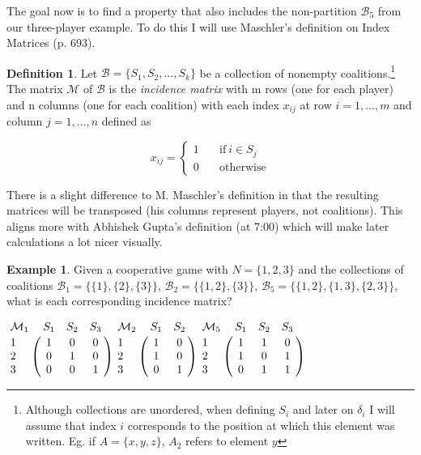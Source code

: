 \documentclass[10pt,a4paper,titlepage]{article}
\theoremstyle{plain}
\theoremstyle{definition}
\newtheorem{definition}[thm]{Definition} %
\newtheorem{example}[thm]{Example} %
\begin{document}
The goal now is to find a property that also includes the non-partition $\mathcal{B}_5$ from our three-player example. To do this I will use Maschler's\cite{maschler} definition on Index Matrices (p. 693).

\begin{definition}\label{def:incidencematrix}
    Let $\mathcal{B} = \{S_1, S_2, ..., S_k\}$ be a collection of nonempty coalitions.\footnote{Although collections are unordered, when defining $S_i$ and later on $\delta_i$ I will assume that index $i$ corresponds to the position at which this element was written. Eg. if $A = \{x, y, z\}$, $A_2$ refers to element $y$} The matrix $\mathcal{M}$ of $\mathcal{B}$ is the \textit{incidence matrix} with m rows (one for each player) and n columns (one for each coalition) with each index $x_{ij}$ at row $i = {1, ..., m}$ and column $j = {1, ..., n}$ defined as\vspace{-15pt}

    \begin{equation*}
        x_{ij} =
        \begin{cases}
            1 & \quad\text{if}\ i \in S_j\\
            0 & \quad\text{otherwise}
        \end{cases}
    \end{equation*}
\end{definition}

There is a slight difference to M. Maschler's\cite{maschler} definition in that the resulting matrices will be transposed (his columns represent players, not coalitions). This aligns more with Abhishek Gupta's\cite{youtube} definition (at 7:00) which will make later calculations a lot nicer visually.

\begin{example}\label{ex:indexmatrix}
    Given a cooperative game with $N = \{1, 2, 3\}$ and the collections of coalitions $\mathcal{B}_1 = \{\{1\}, \{2\}, \{3\}\}$, $\mathcal{B}_2 = \{\{1, 2\}, \{3\}\}$, $\mathcal{B}_5 = \{\{1, 2\}, \{1, 3\}, \{2, 3\}\}$, what is each corresponding incidence matrix?\vspace{8pt}

    $
    \bordermatrix{
    \mathcal{M}_1 & S_1 & S_2 & S_3 \cr
    1 & 1 & 0 & 0 \cr
    2 & 0 & 1 & 0 \cr
    3 & 0 & 0 & 1 \cr
    }
    $\hspace{35pt}$
    \bordermatrix{
    \mathcal{M}_2 & S_1 & S_2\cr
    1 & 1 & 0 \cr
    2 & 1 & 0 \cr
    3 & 0 & 1 \cr
    }
    $\hspace{35pt}$
    \bordermatrix{
    \mathcal{M}_5 & S_1 & S_2 & S_3 \cr
    1 & 1 & 1 & 0 \cr
    2 & 1 & 0 & 1 \cr
    3 & 0 & 1 & 1 \cr
    }
    $\vspace{8pt}
\end{example}
\end{document}
